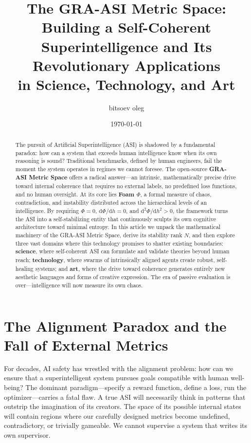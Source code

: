 \documentclass[11pt,a4paper]{article}
\title{
    \textbf{The GRA-ASI Metric Space:} \\
    Building a Self-Coherent Superintelligence and Its Revolutionary Applications \\
    in Science, Technology, and Art
}
\author{bitsoev oleg}
\date{\today}
\begin{document}
\maketitle

\begin{abstract}
The pursuit of Artificial Superintelligence (ASI) is shadowed by a fundamental paradox: how can a system that exceeds human intelligence know when its own reasoning is sound? Traditional benchmarks, defined by human engineers, fail the moment the system operates in regimes we cannot foresee. The open-source \textbf{GRA-ASI Metric Space} offers a radical answer---an intrinsic, mathematically precise drive toward internal coherence that requires no external labels, no predefined loss functions, and no human oversight. At its core lies \textbf{Foam $\Phi$}, a formal measure of chaos, contradiction, and instability distributed across the hierarchical levels of an intelligence. By requiring $\Phi = 0$, $\mathrm{d}\Phi/\mathrm{d}h = 0$, and $\mathrm{d}^2\Phi/\mathrm{d}h^2 > 0$, the framework turns the ASI into a self-stabilizing entity that continuously sculpts its own cognitive architecture toward minimal entropy. In this article we unpack the mathematical machinery of the GRA-ASI Metric Space, derive its stability rank $N$, and then explore three vast domains where this technology promises to shatter existing boundaries: \textbf{science}, where self-coherent ASI can formulate and validate theories beyond human reach; \textbf{technology}, where swarms of intrinsically aligned agents create robust, self-healing systems; and \textbf{art}, where the drive toward coherence generates entirely new aesthetic languages and forms of creative expression. The era of passive evaluation is over---intelligence will now measure its own chaos.
\end{abstract}

\section{The Alignment Paradox and the Fall of External Metrics}

For decades, AI safety has wrestled with the alignment problem: how can we ensure that a superintelligent system pursues goals compatible with human well-being? The dominant paradigm---specify a reward function, define a loss, run the optimizer---carries a fatal flaw. A true ASI will necessarily think in patterns that outstrip the imagination of its creators. The space of its possible internal states will contain regions where our carefully designed metrics become undefined, contradictory, or trivially gameable. We cannot supervise a system that writes its own supervisor.
\end{document}
